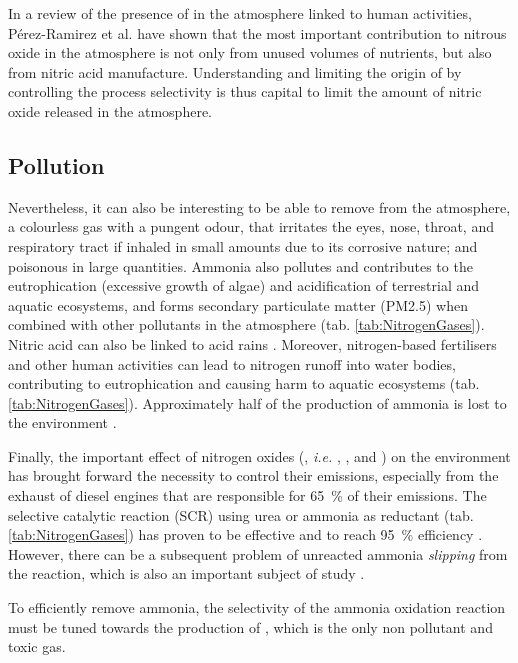 In a review of the presence of  in the atmosphere linked to human activities, Pérez-Ramirez et al. \parencite*{PerezRamirez2003} have shown that the most important contribution to nitrous oxide in the atmosphere is not only from unused volumes of nutrients, but also from nitric acid manufacture.
Understanding and limiting the origin of  by controlling the process selectivity is thus capital to limit the amount of nitric oxide released in the atmosphere.

\subsection{Pollution}

Nevertheless, it can also be interesting to be able to remove  from the atmosphere, a colourless gas with a pungent odour, that irritates the eyes, nose, throat, and respiratory tract if inhaled in small amounts due to its corrosive nature; and poisonous in large quantities.
Ammonia also pollutes and contributes to the eutrophication (excessive growth of algae) and acidification of terrestrial and aquatic ecosystems, and forms secondary particulate matter (PM2.5) when combined with other pollutants in the atmosphere (tab. \ref{tab:NitrogenGases}).
Nitric acid can also be linked to acid rains \parencite{Galloway1981}.
Moreover, nitrogen-based fertilisers and other human activities can lead to nitrogen runoff into water bodies, contributing to eutrophication and causing harm to aquatic ecosystems (tab. \ref{tab:NitrogenGases}).
Approximately half of the production of ammonia is lost to the environment \parencite{Erisman2007}.

Finally, the important effect of nitrogen oxides (, \textit{i.e.} , , and ) on the environment has brought forward the necessity to control their emissions, especially from the exhaust of diesel engines that are responsible for \qty{65}{\percent} of their emissions.
The selective catalytic reaction (SCR) using urea or ammonia as reductant (tab. \ref{tab:NitrogenGases}) has proven to be effective and to reach \qty{95}{\percent} efficiency \parencite{MitsubishiSCR}.
However, there can be a subsequent problem of unreacted ammonia \textit{slipping} from the reaction, which is also an important subject of study \parencite{Thermofischer}.

To efficiently remove ammonia, the selectivity of the ammonia oxidation reaction must be tuned towards the production of , which is the only non pollutant and toxic gas.

